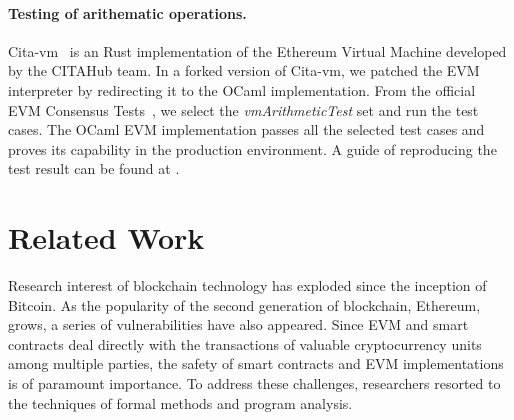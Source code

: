 \documentclass[runningheads]{llncs}
\begin{document}
\paragraph{Testing of arithematic operations.}
Cita-vm~\cite{citavm} is an Rust implementation of the Ethereum Virtual Machine developed by the CITAHub team. 
In a forked version of Cita-vm, we patched the EVM interpreter by redirecting it to the OCaml implementation. 
From the official EVM Consensus Tests~\cite{evmtests},
we select the \emph{vmArithmeticTest} set and run the test cases. 
The OCaml EVM implementation passes all the selected test cases and 
proves its capability in the production environment.
A guide of reproducing the test result can be found at \cite{Examples}.

\section{Related Work}\label{Sec: Related}

Research interest of blockchain technology has exploded since the inception of Bitcoin. 
As the popularity of the second generation of blockchain, 
Ethereum, grows, a series of vulnerabilities have also appeared. 
Since EVM and smart contracts deal directly with the transactions of valuable cryptocurrency units 
among multiple parties, 
the safety of smart contracts and EVM implementations is of paramount importance. 
To address these challenges, 
researchers resorted to the techniques of formal methods and program analysis. 
\end{document}
